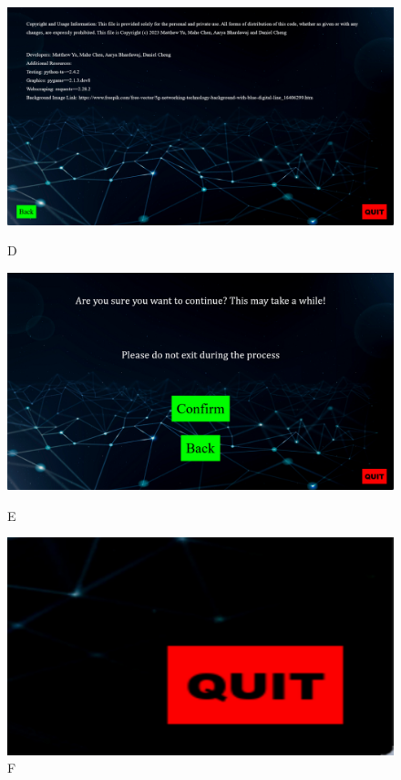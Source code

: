\documentclass[fontsize=12pt]{article}
\begin{document}
\begin{figure}[!htb]
  \includegraphics[width=\linewidth]{img/d.png}
  \caption{D}\label{fig:awesome_image1}
\endminipage\hfill
{}
  \includegraphics[width=\linewidth]{img/e.png}
  \caption{E}\label{fig:awesome_image2}
\endminipage\hfill
{}%
  \includegraphics[width=\linewidth]{img/f.jpg}
  \caption{F}\label{fig:awesome_image3}
\endminipage
\end{figure}
\end{document}
